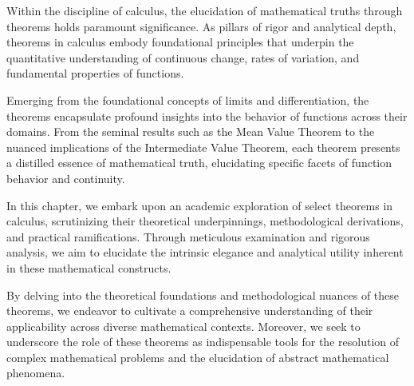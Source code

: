 Within the discipline of calculus, the elucidation of mathematical truths through theorems holds paramount significance. As pillars of rigor and analytical depth, theorems in calculus embody foundational principles that underpin the quantitative understanding of continuous change, rates of variation, and fundamental properties of functions.

Emerging from the foundational concepts of limits and differentiation, the theorems encapsulate profound insights into the behavior of functions across their domains. From the seminal results such as the Mean Value Theorem to the nuanced implications of the Intermediate Value Theorem, each theorem presents a distilled essence of mathematical truth, elucidating specific facets of function behavior and continuity.

In this chapter, we embark upon an academic exploration of select theorems in calculus, scrutinizing their theoretical underpinnings, methodological derivations, and practical ramifications. Through meticulous examination and rigorous analysis, we aim to elucidate the intrinsic elegance and analytical utility inherent in these mathematical constructs.

By delving into the theoretical foundations and methodological nuances of these theorems, we endeavor to cultivate a comprehensive understanding of their applicability across diverse mathematical contexts. Moreover, we seek to underscore the role of these theorems as indispensable tools for the resolution of complex mathematical problems and the elucidation of abstract mathematical phenomena.